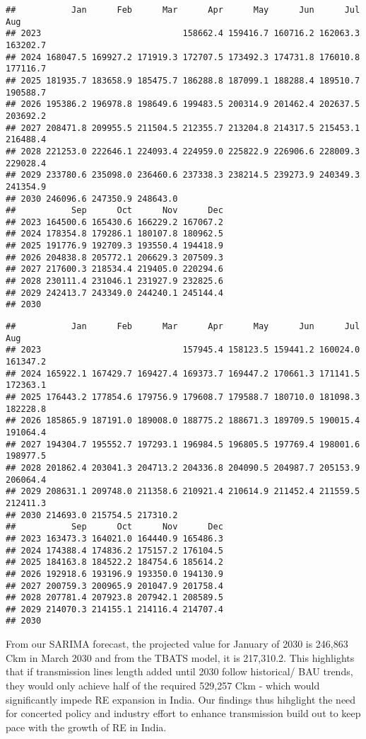 \documentclass[
]{article}
\begin{document}
\begin{verbatim}
##           Jan      Feb      Mar      Apr      May      Jun      Jul      Aug
## 2023                            158662.4 159416.7 160716.2 162063.3 163202.7
## 2024 168047.5 169927.2 171919.3 172707.5 173492.3 174731.8 176010.8 177116.7
## 2025 181935.7 183658.9 185475.7 186288.8 187099.1 188288.4 189510.7 190588.7
## 2026 195386.2 196978.8 198649.6 199483.5 200314.9 201462.4 202637.5 203692.2
## 2027 208471.8 209955.5 211504.5 212355.7 213204.8 214317.5 215453.1 216488.4
## 2028 221253.0 222646.1 224093.4 224959.0 225822.9 226906.6 228009.3 229028.4
## 2029 233780.6 235098.0 236460.6 237338.3 238214.5 239273.9 240349.3 241354.9
## 2030 246096.6 247350.9 248643.0                                             
##           Sep      Oct      Nov      Dec
## 2023 164500.6 165430.6 166229.2 167067.2
## 2024 178354.8 179286.1 180107.8 180962.5
## 2025 191776.9 192709.3 193550.4 194418.9
## 2026 204838.8 205772.1 206629.3 207509.3
## 2027 217600.3 218534.4 219405.0 220294.6
## 2028 230111.4 231046.1 231927.9 232825.6
## 2029 242413.7 243349.0 244240.1 245144.4
## 2030
\end{verbatim}

\begin{verbatim}
##           Jan      Feb      Mar      Apr      May      Jun      Jul      Aug
## 2023                            157945.4 158123.5 159441.2 160024.0 161347.2
## 2024 165922.1 167429.7 169427.4 169373.7 169447.2 170661.3 171141.5 172363.1
## 2025 176443.2 177854.6 179756.9 179608.7 179588.7 180710.0 181098.3 182228.8
## 2026 185865.9 187191.0 189008.0 188775.2 188671.3 189709.5 190015.4 191064.4
## 2027 194304.7 195552.7 197293.1 196984.5 196805.5 197769.4 198001.6 198977.5
## 2028 201862.4 203041.3 204713.2 204336.8 204090.5 204987.7 205153.9 206064.4
## 2029 208631.1 209748.0 211358.6 210921.4 210614.9 211452.4 211559.5 212411.3
## 2030 214693.0 215754.5 217310.2                                             
##           Sep      Oct      Nov      Dec
## 2023 163473.3 164021.0 164440.9 165486.3
## 2024 174388.4 174836.2 175157.2 176104.5
## 2025 184163.8 184522.2 184754.6 185614.2
## 2026 192918.6 193196.9 193350.0 194130.9
## 2027 200759.3 200965.9 201047.9 201758.4
## 2028 207781.4 207923.8 207942.1 208589.5
## 2029 214070.3 214155.1 214116.4 214707.4
## 2030
\end{verbatim}

From our SARIMA forecast, the projected value for January of 2030 is
246,863 Ckm in March 2030 and from the TBATS model, it is 217,310.2.
This highlights that if transmission lines length added until 2030
follow historical/ BAU trends, they would only achieve half of the
required 529,257 Ckm - which would significantly impede RE expansion in
India. Our findings thus hihglight the need for concerted policy and
industry effort to enhance transmission build out to keep pace with the
growth of RE in India.
\end{document}
